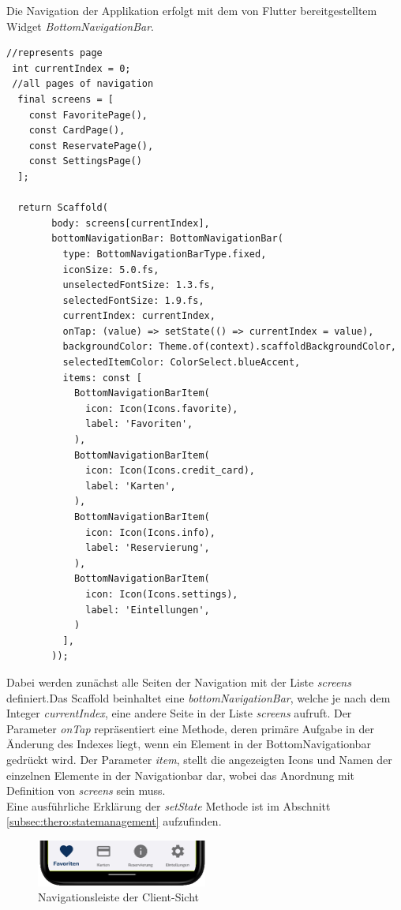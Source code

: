 \newpage
{}\label{subsec:impl:routes}
Die Navigation der Applikation erfolgt mit dem von Flutter bereitgestelltem Widget
{\textit{BottomNavigationBar}}.
\begin{lstlisting}[caption=Navigation der Client Anwendung,style=goMono]
//represents page
 int currentIndex = 0;
 //all pages of navigation
  final screens = [
    const FavoritePage(),
    const CardPage(),
    const ReservatePage(),
    const SettingsPage()
  ];

  return Scaffold(
        body: screens[currentIndex],
        bottomNavigationBar: BottomNavigationBar(
          type: BottomNavigationBarType.fixed,
          iconSize: 5.0.fs,
          unselectedFontSize: 1.3.fs,
          selectedFontSize: 1.9.fs,
          currentIndex: currentIndex,
          onTap: (value) => setState(() => currentIndex = value),
          backgroundColor: Theme.of(context).scaffoldBackgroundColor,
          selectedItemColor: ColorSelect.blueAccent,
          items: const [
            BottomNavigationBarItem(
              icon: Icon(Icons.favorite),
              label: 'Favoriten',
            ),
            BottomNavigationBarItem(
              icon: Icon(Icons.credit_card),
              label: 'Karten',
            ),
            BottomNavigationBarItem(
              icon: Icon(Icons.info),
              label: 'Reservierung',
            ),
            BottomNavigationBarItem(
              icon: Icon(Icons.settings),
              label: 'Eintellungen',
            )
          ],
        ));
\end{lstlisting}
Dabei werden zunächst alle Seiten der Navigation mit der Liste {\textit{screens}} definiert.Das Scaffold beinhaltet eine {\textit{bottomNavigationBar}}, welche je nach dem Integer {\textit{currentIndex}}, eine andere Seite in der Liste {\textit{screens}} aufruft. Der Parameter {\textit{onTap}} repräsentiert eine Methode, deren primäre Aufgabe in der Änderung des Indexes liegt, wenn ein Element in der BottomNavigationbar gedrückt wird. Der Parameter {\textit{item}}, stellt die angezeigten Icons und Namen der einzelnen Elemente in der Navigationbar dar, wobei das Anordnung mit Definition von {\textit{screens}} sein muss.\\ Eine ausf\"uhrliche Erkl\"arung der {\textit{setState}} Methode ist im Abschnitt \ref{subsec:thero:statemanagement}  aufzufinden.

\vspace{1cm}
\begin{figure}[h!]
\centering
\includegraphics[width=0.5\textwidth]{FLUTTER/images/ZB/bottom_navigation.png}
\caption{Navigationsleiste der Client-Sicht}
\end{figure}



